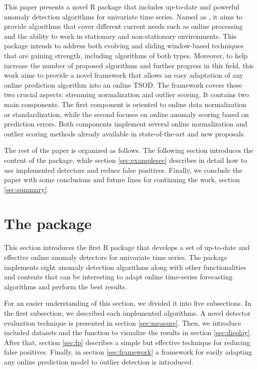 \documentclass[a4paper]{article}\usepackage[]{graphicx}\usepackage[]{color}
\begin{document}
This paper presents a novel R package that includes up-to-date and powerful anomaly detection algorithms for univariate time series. Named as , it aims to provide algorithms that cover different current needs such as online processing and the ability to work in stationary and non-stationary environments. This package intends to address both evolving and sliding window-based techniques that are gaining strength, including algorithms of both types. Moreover, to help increase the number of proposed algorithms and further progress in this field, this work aims to provide a novel framework that allows an easy adaptation of any online prediction algorithm into an online TSOD. The framework covers these two crucial aspects: streaming normalization and outlier scoring. It contains two main components. The first component is oriented to online data normalization or standardization, while the second focuses on online anomaly scoring based on prediction errors. Both components implement several online normalization and outlier scoring methods already available in state-of-the-art and new proposals.

The rest of the paper is organized as follows. The following section introduces the content of the  package, while section \ref{sec:examplesec} describes in detail how to use implemented detectors and reduce false positives. Finally, we conclude the paper with some conclusions and future lines for continuing the work, section \ref{sec:summary}.

\section{The  package}\label{sec:package}

This section introduces the first R package that develops a set of up-to-date and effective online anomaly detectors for univariate time series. The  package implements eight anomaly detection algorithms along with other functionalities and contents that can be interesting to adapt online time-series forecasting algorithms and perform the best results.

For an easier understanding of this section, we divided it into five subsections. In the first subsection, we described each implemented algorithms. A novel detector evaluation technique is presented in section \ref{sec:measure}. Then, we introduce included datasets and the function to visualize the results in section \ref{sec:display}. After that, section \ref{sec:fp} describes a simple but effective technique for reducing false positives. Finally, in section \ref{sec:framework} a framework for easily adapting any online prediction model to outlier detection is introduced.
\end{document}
